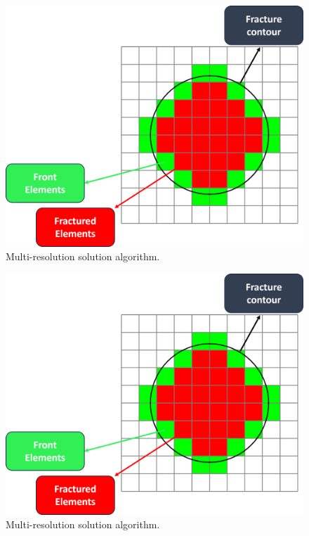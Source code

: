 \begin{figure}[h]
    \centering
    \includegraphics[width=\linewidth]{Chapter4/figures/penny_with_descriptions.png}
    \caption{Multi-resolution solution algorithm.}
    \label{fig:lorem4}
\end{figure}

\begin{figure}[h]
    \centering
    \includegraphics[width=\linewidth]{Chapter4/figures/penny_with_descriptions.png}
    \caption{Multi-resolution solution algorithm.}
    \label{fig:lorem4}
\end{figure}

